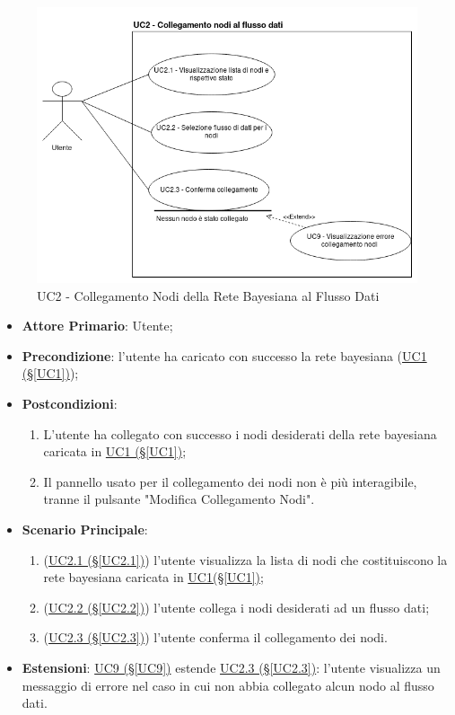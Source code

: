 \begin{figure}[H]
\centering
\includegraphics[scale=0.5]{./images/UC2.png}
\caption{UC2 - Collegamento Nodi della Rete Bayesiana al Flusso Dati}
\end{figure}

\begin{itemize}
\item \textbf{Attore Primario}: Utente;
\item \textbf{Precondizione}: l'utente ha caricato con successo la rete bayesiana (\hyperref[UC1]{UC1 (§\ref*{UC1})});
\item \textbf{Postcondizioni}: 
	\begin{enumerate}
	\item L'utente ha collegato con successo i nodi desiderati della rete bayesiana caricata in \hyperref[UC1]{UC1 				(§\ref*{UC1})};
	\item Il pannello usato per il collegamento dei nodi non è più interagibile, tranne il pulsante "Modifica 							Collegamento Nodi".
	\end{enumerate}
\item \textbf{Scenario Principale}:
	\begin{enumerate}
	\item (\hyperref[UC2.1]{UC2.1 (§\ref*{UC2.1})}) l'utente visualizza la lista di nodi che costituiscono la rete bayesiana caricata in \hyperref[UC1]{UC1(§\ref*{UC1})};
	\item (\hyperref[UC2.2]{UC2.2 (§\ref*{UC2.2})}) l'utente collega i nodi desiderati ad un flusso dati;
	\item (\hyperref[UC2.3]{UC2.3 (§\ref*{UC2.3})}) l'utente conferma il collegamento dei nodi.
	\end{enumerate}
\item \textbf{Estensioni}: \hyperref[UC9]{UC9 (§\ref*{UC9})} estende \hyperref[UC2.3]{UC2.3 (§\ref*{UC2.3})}: l'utente visualizza un messaggio di errore nel caso in cui non abbia collegato alcun nodo al flusso dati.
\end{itemize}

